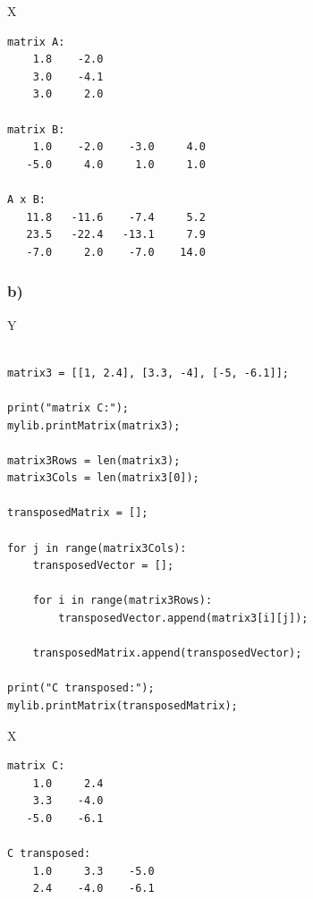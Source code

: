 X


\begin{lstlisting}[caption=Result of 1.2 a), keywordstyle=\color{black}]
matrix A:
    1.8    -2.0
    3.0    -4.1
    3.0     2.0

matrix B:
    1.0    -2.0    -3.0     4.0
   -5.0     4.0     1.0     1.0

A x B:
   11.8   -11.6    -7.4     5.2
   23.5   -22.4   -13.1     7.9
   -7.0     2.0    -7.0    14.0
\end{lstlisting}

\subsubsection{b)}

Y

\begin{lstlisting}[caption=todo]

matrix3 = [[1, 2.4], [3.3, -4], [-5, -6.1]];

print("matrix C:");
mylib.printMatrix(matrix3);

matrix3Rows = len(matrix3);
matrix3Cols = len(matrix3[0]);

transposedMatrix = [];

for j in range(matrix3Cols):
	transposedVector = [];

	for i in range(matrix3Rows):
		transposedVector.append(matrix3[i][j]);
	
	transposedMatrix.append(transposedVector);

print("C transposed:");
mylib.printMatrix(transposedMatrix);

\end{lstlisting}

X


\begin{lstlisting}[caption=Result of 1.2 b), keywordstyle=\color{black}]
matrix C:
    1.0     2.4
    3.3    -4.0
   -5.0    -6.1

C transposed:
    1.0     3.3    -5.0
    2.4    -4.0    -6.1
\end{lstlisting}

